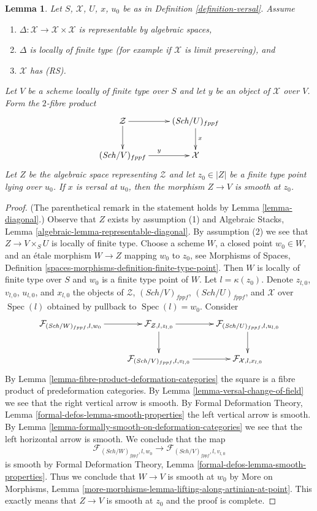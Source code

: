 \documentclass[10pt,a4paper]{amsart}
\theoremstyle{plain}
\newtheorem{lemma}[subsection]{Lemma}
\theoremstyle{definition}
\theoremstyle{remark}
\numberwithin{equation}{subsection}
\def\Spec{\mathop{\mathrm{Spec}}}
\def\Sch{\mathit{Sch}}
\begin{document}
\begin{lemma}
\label{lemma-base-change-versal}
Let $S$, $\mathcal{X}$, $U$, $x$, $u_0$ be as in
Definition \ref{definition-versal}. Assume
\begin{enumerate}
\item $\Delta : \mathcal{X} \to \mathcal{X} \times \mathcal{X}$
is representable by algebraic spaces,
\item $\Delta$ is locally of finite type
(for example if $\mathcal{X}$ is limit preserving), and
\item $\mathcal{X}$ has (RS).
\end{enumerate}
Let $V$ be a scheme locally of finite type over $S$
and let $y$ be an object of $\mathcal{X}$ over $V$.
Form the $2$-fibre product
$$
\xymatrix{
\mathcal{Z} \ar[r] \ar[d] & (\Sch/U)_{fppf} \ar[d]^x \\
(\Sch/V)_{fppf} \ar[r]^y & \mathcal{X}
}
$$
Let $Z$ be the algebraic space representing $\mathcal{Z}$
and let $z_0 \in |Z|$ be a finite type point lying over $u_0$.
If $x$ is versal at $u_0$, then
the morphism $Z \to V$ is smooth at $z_0$.
\end{lemma}

\begin{proof}
(The parenthetical remark in the statement holds by
Lemma \ref{lemma-diagonal}.)
Observe that $Z$ exists by assumption (1) and Algebraic Stacks, Lemma
\ref{algebraic-lemma-representable-diagonal}. By assumption (2) we see that
$Z \to V \times_S U$ is locally of finite type.
Choose a scheme $W$, a closed point $w_0 \in W$, and
an \'etale morphism $W \to Z$ mapping $w_0$ to $z_0$, see
Morphisms of Spaces, Definition
\ref{spaces-morphisms-definition-finite-type-point}.
Then $W$ is locally of finite type over $S$ and
$w_0$ is a finite type point of $W$.
Let $l = \kappa(z_0)$. Denote $z_{l, 0}$, $v_{l, 0}$,
$u_{l, 0}$, and $x_{l, 0}$ the objects of
$\mathcal{Z}$, $(\Sch/V)_{fppf}$, $(\Sch/U)_{fppf}$,
and $\mathcal{X}$ over $\Spec(l)$ obtained by pullback to $\Spec(l) = w_0$.
Consider
$$
\xymatrix{
\mathcal{F}_{(\Sch/W)_{fppf}, l, w_0} \ar[r] &
\mathcal{F}_{\mathcal{Z}, l, z_{l, 0}} \ar[d] \ar[r] &
\mathcal{F}_{(\Sch/U)_{fppf}, l, u_{l, 0}} \ar[d] \\
& \mathcal{F}_{(\Sch/V)_{fppf}, l, v_{l, 0}} \ar[r] &
\mathcal{F}_{\mathcal{X}, l, x_{l, 0}}
}
$$
By Lemma \ref{lemma-fibre-product-deformation-categories}
the square is a fibre product of predeformation categories.
By Lemma \ref{lemma-versal-change-of-field}
we see that the right vertical arrow is smooth.
By Formal Deformation Theory, Lemma
\ref{formal-defos-lemma-smooth-properties}
the left vertical arrow is smooth.
By Lemma \ref{lemma-formally-smooth-on-deformation-categories}
we see that the left horizontal arrow is smooth.
We conclude that the map
$$
\mathcal{F}_{(\Sch/W)_{fppf}, l, w_0} \to
\mathcal{F}_{(\Sch/V)_{fppf}, l, v_{l, 0}}
$$
is smooth by Formal Deformation Theory, Lemma
\ref{formal-defos-lemma-smooth-properties}.
Thus we conclude that $W \to V$ is smooth at $w_0$ by
More on Morphisms, Lemma
\ref{more-morphisms-lemma-lifting-along-artinian-at-point}.
This exactly means that $Z \to V$ is smooth at $z_0$
and the proof is complete.
\end{proof}
\end{document}
